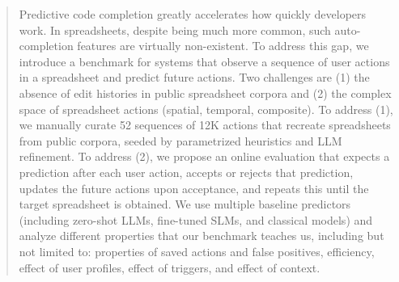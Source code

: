 \documentclass{article}
\theoremstyle{plain}
\theoremstyle{definition}
\theoremstyle{remark}
\begin{document}



\printAffiliationsAndNotice{}  %

\begin{abstract}
Predictive code completion greatly accelerates how quickly developers work.
In spreadsheets, despite being much more common, such auto-completion features are virtually non-existent.
To address this gap, we introduce a benchmark for systems that observe a sequence of user actions in a spreadsheet and predict future actions.
Two challenges are (1) the absence of edit histories in public spreadsheet corpora and (2) the complex space of spreadsheet actions (spatial, temporal, composite).
To address (1), we manually curate 52 sequences of 12K actions that recreate spreadsheets from public corpora, seeded by parametrized heuristics and LLM refinement.
To address (2), we propose an online evaluation that expects a prediction after each user action, accepts or rejects that prediction, updates the future actions upon acceptance, and repeats this until the target spreadsheet is obtained.
We use multiple baseline predictors (including zero-shot LLMs, fine-tuned SLMs, and classical models) and analyze different properties that our benchmark teaches us, including but not limited to: properties of saved actions and false positives, efficiency, effect of user profiles, effect of triggers, and effect of context.

\end{abstract}
\end{document}
